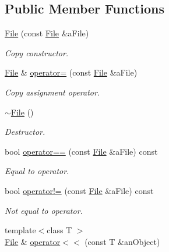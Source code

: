 \subsection*{Public Member Functions}
\begin{DoxyCompactItemize}
\item 
\mbox{\hyperlink{classlibrary_1_1core_1_1fs_1_1_file_a6f3f0d79545ac9984c6f49432f0c6c39}{File}} (const \mbox{\hyperlink{classlibrary_1_1core_1_1fs_1_1_file}{File}} \&a\+File)
\begin{DoxyCompactList}\small\item\em Copy constructor. \end{DoxyCompactList}\item 
\mbox{\hyperlink{classlibrary_1_1core_1_1fs_1_1_file}{File}} \& \mbox{\hyperlink{classlibrary_1_1core_1_1fs_1_1_file_a8143d55e67cf2d6256c7653619a03909}{operator=}} (const \mbox{\hyperlink{classlibrary_1_1core_1_1fs_1_1_file}{File}} \&a\+File)
\begin{DoxyCompactList}\small\item\em Copy assignment operator. \end{DoxyCompactList}\item 
\mbox{\hyperlink{classlibrary_1_1core_1_1fs_1_1_file_aaea7205fab73035b6839b75395169d22}{$\sim$\+File}} ()
\begin{DoxyCompactList}\small\item\em Destructor. \end{DoxyCompactList}\item 
bool \mbox{\hyperlink{classlibrary_1_1core_1_1fs_1_1_file_a44ab79a23c5a129be298a026dbeec62f}{operator==}} (const \mbox{\hyperlink{classlibrary_1_1core_1_1fs_1_1_file}{File}} \&a\+File) const
\begin{DoxyCompactList}\small\item\em Equal to operator. \end{DoxyCompactList}\item 
bool \mbox{\hyperlink{classlibrary_1_1core_1_1fs_1_1_file_a0354b6dd59250c07cd5a8b679dc36d95}{operator!=}} (const \mbox{\hyperlink{classlibrary_1_1core_1_1fs_1_1_file}{File}} \&a\+File) const
\begin{DoxyCompactList}\small\item\em Not equal to operator. \end{DoxyCompactList}\item 
{\footnotesize template$<$class T $>$ }\\\mbox{\hyperlink{classlibrary_1_1core_1_1fs_1_1_file}{File}} \& \mbox{\hyperlink{classlibrary_1_1core_1_1fs_1_1_file_ad41b20bf5ad58a760115c43d8c84e130}{operator$<$$<$}} (const T \&an\+Object)

\end{DoxyCompactItemize}
